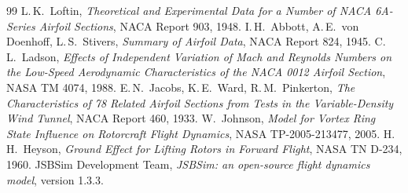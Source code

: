 \documentclass[10pt,a4paper,twocolumn]{article}
\begin{document}
\begin{thebibliography}{99}
 L.\,K.\ Loftin, \emph{Theoretical and Experimental Data for a Number of NACA 6A-Series Airfoil Sections}, NACA Report 903, 1948.
 I.\,H.\ Abbott, A.\,E.\ von Doenhoff, L.\,S.\ Stivers, \emph{Summary of Airfoil Data}, NACA Report 824, 1945.
 C.\,L.\ Ladson, \emph{Effects of Independent Variation of Mach and Reynolds Numbers on the Low-Speed Aerodynamic Characteristics of the NACA 0012 Airfoil Section}, NASA TM 4074, 1988.
 E.\,N.\ Jacobs, K.\,E.\ Ward, R.\,M.\ Pinkerton, \emph{The Characteristics of 78 Related Airfoil Sections from Tests in the Variable-Density Wind Tunnel}, NACA Report 460, 1933.
 W.\ Johnson, \emph{Model for Vortex Ring State Influence on Rotorcraft Flight Dynamics}, NASA TP-2005-213477, 2005.
 H.\,H.\ Heyson, \emph{Ground Effect for Lifting Rotors in Forward Flight}, NASA TN D-234, 1960.
 JSBSim Development Team, \emph{JSBSim: an open-source flight dynamics model}, version 1.3.3.
\end{thebibliography}
\end{document}
